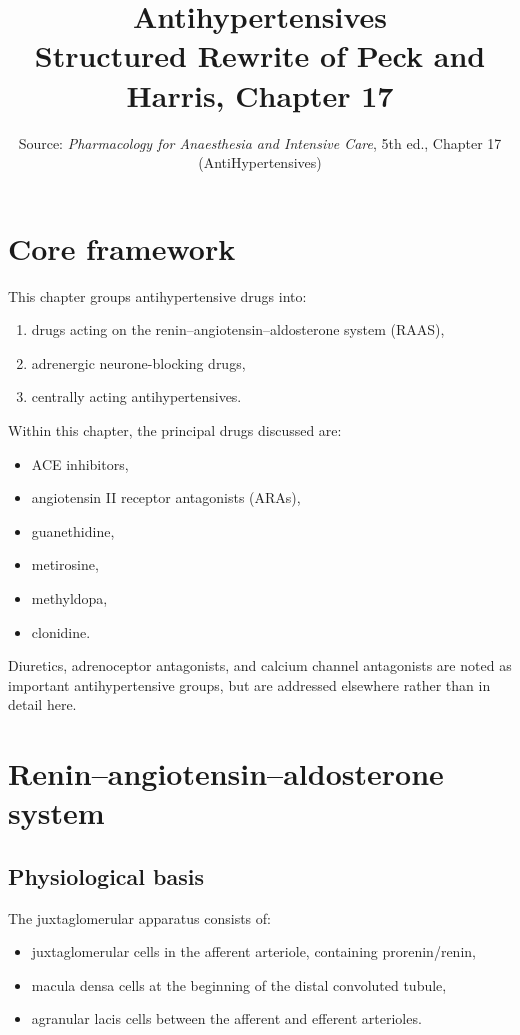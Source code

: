 \documentclass[11pt,a4paper]{article}
\title{Antihypertensives\\Structured Rewrite of Peck and Harris, Chapter 17}
\author{}
\date{Source: \textit{Pharmacology for Anaesthesia and Intensive Care}, 5th ed., Chapter 17 (AntiHypertensives)}
\begin{document}
\maketitle
\tableofcontents
\newpage

\section{Core framework}

This chapter groups antihypertensive drugs into:
\begin{enumerate}
    \item drugs acting on the renin--angiotensin--aldosterone system (RAAS),
    \item adrenergic neurone-blocking drugs,
    \item centrally acting antihypertensives.
\end{enumerate}

Within this chapter, the principal drugs discussed are:
\begin{itemize}
    \item ACE inhibitors,
    \item angiotensin II receptor antagonists (ARAs),
    \item guanethidine,
    \item metirosine,
    \item methyldopa,
    \item clonidine.
\end{itemize}

Diuretics, adrenoceptor antagonists, and calcium channel antagonists are noted as important antihypertensive groups, but are addressed elsewhere rather than in detail here.

\section{Renin--angiotensin--aldosterone system}

\subsection{Physiological basis}

The juxtaglomerular apparatus consists of:
\begin{itemize}
    \item juxtaglomerular cells in the afferent arteriole, containing prorenin/renin,
    \item macula densa cells at the beginning of the distal convoluted tubule,
    \item agranular lacis cells between the afferent and efferent arterioles.
\end{itemize}
\end{document}
